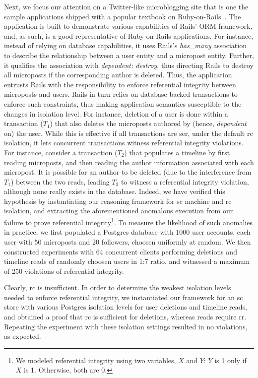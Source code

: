 Next, we focus our attention on a Twitter-like microblogging site that
is one the sample applications shipped with a popular textbook on
Ruby-on-Rails~\cite{railsbook}. The application is built to
demonstrate various capabilities of Rails' ORM framework, and, as
such, is a good representative of Ruby-on-Rails applications.  For
instance, instead of relying on database capabilities, it uses Rails's
\emph{has\_many} association to describe the relationship between a
user entity and a micropost entity. Further, it qualifies the
association with \emph{dependent: destroy}, thus directing Rails to
destroy all microposts if the corresponding author is deleted. Thus,
the application entrusts Rails with the responsibility to enforce
referential integrity between microposts and users. Rails in turn
relies on database-backed transactions to enforce such constraints,
thus making application semantics susceptible to the changes in
isolation level.  For instance, deletion of a user is done within a
transaction ($T_1$) that also deletes the microposts authored by
(hence, \emph{dependent} on) the user. While this is effective if all
transactions are {\sc ser}, under the default {\sc rc} isolation, it
lets concurrent transactions witness referential integrity violations.
For instance, consider a transaction ($T_2$) that populates a timeline
by first reading microposts, and then reading the author information
associated with each micropost. It is possible for an author to be
deleted (due to the interference from $T_1$) between the two reads,
leading $T_2$ to witness a referential integrity violation, although
none really exists in the database.  Indeed, we have verified this
hypothesis by instantiating our reasoning framework for {\sc sc}
machine and {\sc rc} isolation, and extracting the aforementioned
anomalous execution from our failure to prove referential
integrity\footnote{We modeled referential integrity using two
variables, $X$ and $Y$: $Y$ is 1 only if $X$ is 1.  Otherwise, both
are 0.}. To measure the likelihood of such anomalies in practice, we
first populated a Postgres database with 1000 user accounts, each user
with 50 microposts and 20 followers, choosen uniformly at random. We
then constructed experiments with 64 concurrent clients performing
deletions and timeline reads of randomly choosen users in 1:7 ratio,
and witnessed a maximum of 250 violations of referential integrity.

Clearly, {\sc rc} is insufficient. In order to determine the weakest
isolation levels needed to enforce referential integrity, we
instantiated our framework for an {\sc sc} store with various Postgres
isolation levels for user deletions and timeline reads, and obtained a
proof that {\sc rc} is sufficient for deletions, whereas reads require
{\sc rr}. Repeating the experiment with these isolation settings
resulted in no violations, as expected.
